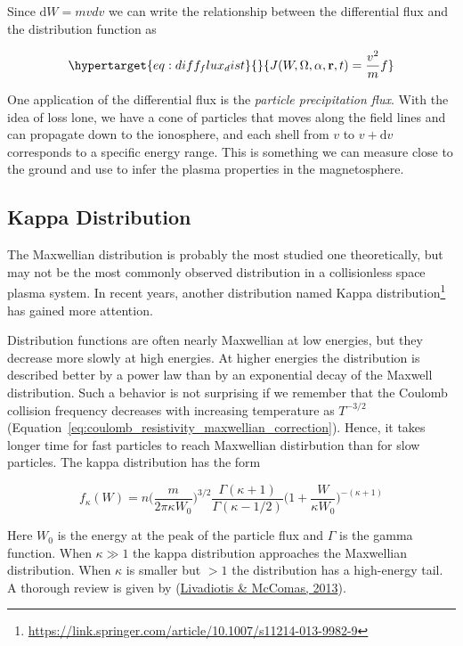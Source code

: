 \documentclass[
  notoc %
]{tufte-book}
\DeclareRobustCommand{\href}[2]{#2\footnote{\url{#1}}}
\begin{document}
Since \(\mathrm{d}W=mvdv\) we can write the relationship between the
differential flux and the distribution function as

\begin{equation}\protect\hypertarget{eq:diff_flux_dist}{}{
J(W,\Omega, \alpha, \mathbf{r},t) = \frac{v^2}{m}f
}\label{eq:diff_flux_dist}\end{equation}

One application of the differential flux is the \emph{particle
precipitation flux}. With the idea of loss lone, we have a cone of
particles that moves along the field lines and can propagate down to the
ionosphere, and each shell from \(v\) to \(v+\mathrm{d}v\) corresponds
to a specific energy range. This is something we can measure close to
the ground and use to infer the plasma properties in the magnetosphere.

\hypertarget{kappa-distribution}{%
\subsection{Kappa Distribution}\label{kappa-distribution}}

The Maxwellian distribution is probably the most studied one
theoretically, but may not be the most commonly observed distribution in
a collisionless space plasma system. In recent years, another
distribution named
\href{https://link.springer.com/article/10.1007/s11214-013-9982-9}{Kappa
distribution} has gained more attention.

Distribution functions are often nearly Maxwellian at low energies, but
they decrease more slowly at high energies. At higher energies the
distribution is described better by a power law than by an exponential
decay of the Maxwell distribution. Such a behavior is not surprising if
we remember that the Coulomb collision frequency decreases with
increasing temperature as \(T^{-3/2}\)
(Equation~\ref{eq:coulomb_resistivity_maxwellian_correction}). Hence, it
takes longer time for fast particles to reach Maxwellian distirbution
than for slow particles. The kappa distribution has the form

\[
f_\kappa(W) = n\Big( \frac{m}{2\pi\kappa W_0} \Big)^{3/2}\frac{\Gamma(\kappa + 1)}{\Gamma(\kappa-1/2)}\Big( 1+\frac{W}{\kappa W_0} \Big)^{-(\kappa+1)}
\]

Here \(W_0\) is the energy at the peak of the particle flux and
\(\Gamma\) is the gamma function. When \(\kappa\gg 1\) the kappa
distribution approaches the Maxwellian distribution. When \(\kappa\) is
smaller but \(>1\) the distribution has a high-energy tail. A thorough
review is given by (\protect\hyperlink{ref-livadiotis2013}{Livadiotis \&
McComas, 2013}).
\end{document}

